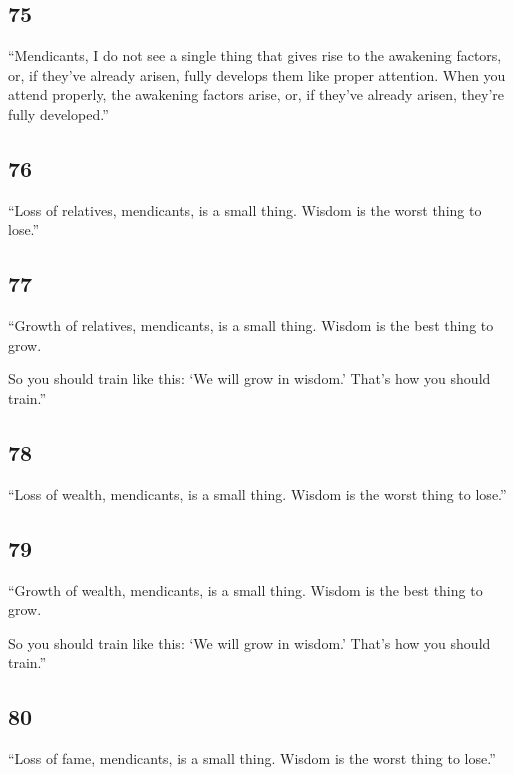 \documentclass[12pt,openany]{book}%
\begin{document}
\subsection*{75 }

“Mendicants, I do not see a single thing that gives rise to the awakening factors, or, if they’ve already arisen, fully develops them like proper attention. When you attend properly, the awakening factors arise, or, if they’ve already arisen, they’re fully developed.” 

\subsection*{76 }

“Loss of relatives, mendicants, is a small thing. Wisdom is the worst thing to lose.” 

\subsection*{77 }

“Growth of relatives, mendicants, is a small thing. Wisdom is the best thing to grow. 

So you should train like this: ‘We will grow in wisdom.’ That’s how you should train.” 

\subsection*{78 }

“Loss of wealth, mendicants, is a small thing. Wisdom is the worst thing to lose.” 

\subsection*{79 }

“Growth of wealth, mendicants, is a small thing. Wisdom is the best thing to grow. 

So you should train like this: ‘We will grow in wisdom.’ That’s how you should train.” 

\subsection*{80 }

“Loss of fame, mendicants, is a small thing. Wisdom is the worst thing to lose.” 
\end{document}
